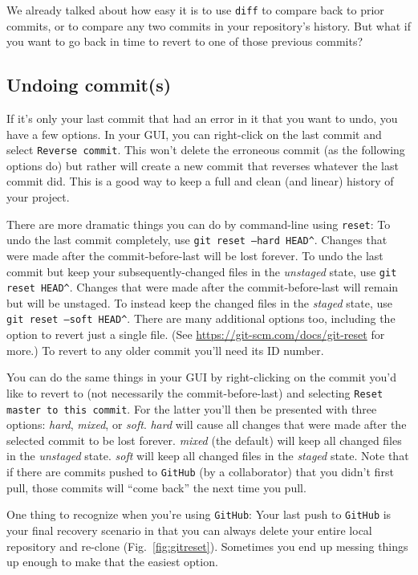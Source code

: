 \documentclass[12pt,letterpaper]{article}
\begin{document}
We already talked about how easy it is to use \texttt{diff} to compare back to prior commits, or to compare any two commits in your repository's history.
But what if you want to go back in time to revert to one of those previous commits?

\subsection{Undoing commit(s)}
If it's only your last commit that had an error in it that you want to undo, 
you have a few options.
In your GUI, you can  right-click on the last commit and select \texttt{Reverse 
commit}.
This won't delete the erroneous commit (as the following options do) but rather 
will create a new commit that reverses whatever the last commit did.
This is a good way to keep a full and clean (and linear) history of your project.


There are more dramatic things you can do by command-line using 
\texttt{reset}:
To undo the last commit completely, 
use \texttt{git reset --hard HEAD\^}.
Changes that were made after the commit-before-last will be lost forever.
To undo the last commit but keep your subsequently-changed files in the \emph{unstaged} state, use \texttt{git reset HEAD\^}.
Changes that were made after the commit-before-last will remain but will be 
unstaged. 
To instead keep the changed files in the \emph{staged} state, 
use \texttt{git reset --soft HEAD\^}.
There are many additional options too, including the option to revert just a single file.
(See \url{https://git-scm.com/docs/git-reset} for more.)
To revert to any older commit you'll need its ID number.

You can do the same things in your GUI by right-clicking on the commit you'd 
like to revert to (not necessarily the commit-before-last) and selecting 
\texttt{Reset master to this commit}.
For the latter you'll then be presented with three options: 
\emph{hard}, \emph{mixed}, or \emph{soft}.
\emph{hard} will cause all changes that were made after the selected commit to  be lost forever.
\emph{mixed} (the default) will keep all changed files in the \emph{unstaged} state.
\emph{soft} will keep all changed files in the \emph{staged} state.
Note that if there are commits pushed to \texttt{GitHub} (by a collaborator) that 
you didn't first pull, those commits will ``come back'' the next time you pull.

One thing to recognize when you're using \texttt{GitHub}:
Your last push to \texttt{GitHub} is your final recovery scenario in that you can always delete your entire local repository and re-clone (Fig.~\ref{fig:gitreset}).
Sometimes you end up messing things up enough to make that the easiest option.
\end{document}
